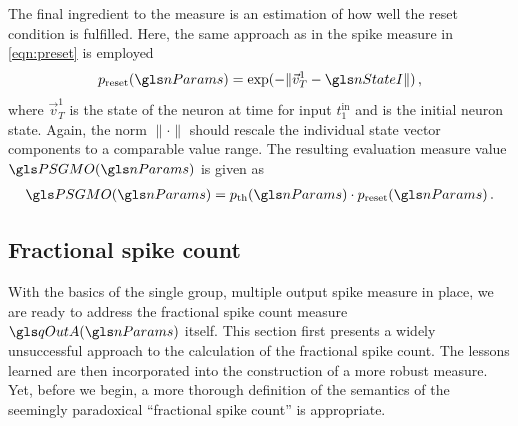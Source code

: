 The final ingredient to the measure is an estimation of how well the reset condition is fulfilled. Here, the same approach as in the \SGSO spike measure in \cref{eqn:preset} is employed
\begin{align}
	p_\mathrm{reset}(\nParams) = \exp(-\|\vec v^1_T - \nStateI \|)\,,
\end{align}
where $\vec v^1_T$ is the state of the neuron at time \timeWindow for input $t^\mathrm{in}_1$ and \nStateI is the initial neuron state. Again, the norm $\|\cdot\|$ should rescale the individual state vector components to a comparable value range. The resulting evaluation measure value $\PSGMO(\nParams)$ is given as
\begin{align}
	\PSGMO(\nParams) = p_\mathrm{th}(\nParams) \cdot p_\mathrm{reset}(\nParams) \,.
\end{align}

\subsection{Fractional spike count}
\label{sec:sgmo_measure_fractional_spike_count}

With the basics of the single group, multiple output spike measure in place, we are ready to address the fractional spike count measure $\qOutA(\nParams)$ itself. This section first presents a widely unsuccessful approach to the calculation of the fractional spike count. The lessons learned are then incorporated into the construction of a more robust measure. Yet, before we begin, a more thorough definition of the semantics of the seemingly paradoxical \enquote{fractional spike count} is appropriate.

